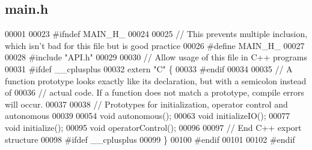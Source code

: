 \subsection{main.\+h}
\label{main_8h_source}

\begin{DoxyCode}
00001 
00023 \textcolor{preprocessor}{#ifndef MAIN\_H\_}
00024 
00025 \textcolor{comment}{// This prevents multiple inclusion, which isn't bad for this file but is good practice}
00026 \textcolor{preprocessor}{#define MAIN\_H\_}
00027 
00028 \textcolor{preprocessor}{#include "API.h"}
00029 
00030 \textcolor{comment}{// Allow usage of this file in C++ programs}
00031 \textcolor{preprocessor}{#ifdef \_\_cplusplus}
00032 \textcolor{keyword}{extern} \textcolor{stringliteral}{"C"} \{
00033 \textcolor{preprocessor}{#endif}
00034 
00035 \textcolor{comment}{// A function prototype looks exactly like its declaration, but with a semicolon instead of}
00036 \textcolor{comment}{// actual code. If a function does not match a prototype, compile errors will occur.}
00037 
00038 \textcolor{comment}{// Prototypes for initialization, operator control and autonomous}
00039 
00054 \textcolor{keywordtype}{void} autonomous();
00063 \textcolor{keywordtype}{void} initializeIO();
00077 \textcolor{keywordtype}{void} initialize();
00095 \textcolor{keywordtype}{void} operatorControl();
00096 
00097 \textcolor{comment}{// End C++ export structure}
00098 \textcolor{preprocessor}{#ifdef \_\_cplusplus}
00099 \}
00100 \textcolor{preprocessor}{#endif}
00101 
00102 \textcolor{preprocessor}{#endif}
\end{DoxyCode}
